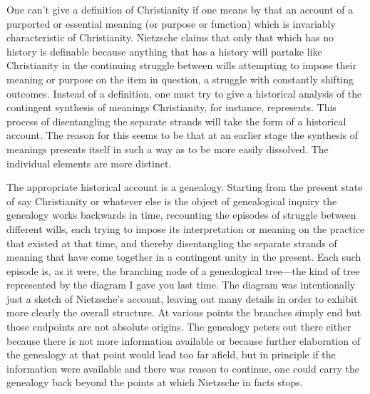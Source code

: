 One can't give a definition of Christianity if one means by that an account of a purported or essential meaning (or purpose or function) which is invariably characteristic of Christianity. Nietzsche claims that only that which has no history is definable because anything that has a history will partake like Christianity in the continuing struggle between wills attempting to impose their meaning or purpose on the item in question, a struggle with constantly shifting outcomes. Instead of a definition, one must try to give a historical analysis of the contingent synthesis of meanings Christianity, for instance, represents. This process of disentangling the separate strands will take the form of a historical account. The reason for this seems to be that  at an earlier stage the synthesis of meanings presents itself in such a way as to be more easily dissolved. The individual elements are more distinct.

The appropriate historical account is a genealogy. Starting from the present state of say Christianity or whatever else is the object of genealogical inquiry the genealogy works backwards in time, recounting the episodes of struggle between different wills, each trying to impose its interpretation or meaning on the practice that existed at that time, and thereby disentangling the separate strands of meaning that have come together in a contingent unity in the present. Each such episode is, as it were, the branching node of a genealogical tree---the kind of tree represented by the diagram I gave you last time. The diagram was intentionally just a sketch of Nietzsche's account, leaving out many details in order to exhibit more clearly the overall structure. At various points the branches simply end but those endpoints are not absolute origins. The genealogy peters out there either because there is not more information available or because further elaboration of the genealogy at that point would lead too far afield, but in principle if the information were available and there was reason to continue, one could carry the genealogy back beyond the points at which Nietzsche in facts stops.

